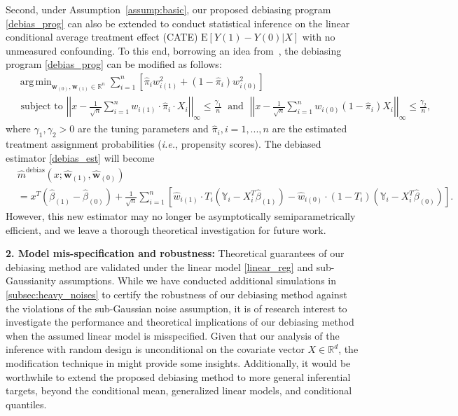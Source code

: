 \documentclass[ejsv2,noshowframe]{imsart}
\theoremstyle{plain}
\theoremstyle{definition}
\theoremstyle{remark}
\DeclareMathOperator*{\argmin}{arg\,min}
\newcommand{\norm}[1]{\left|\left| #1 \right|\right|}
\renewcommand{\hat}{\widehat}
\begin{document}
Second, under Assumption~\ref{assump:basic}, our proposed debiasing program \eqref{debias_prog} can also be extended to conduct statistical inference on the linear conditional average treatment effect (CATE) $\mathrm{E}[Y(1) - Y(0) | X]$ with no unmeasured confounding. To this end, borrowing an idea from~\cite{giessing2021inference}, the debiasing program \eqref{debias_prog} can be modified as follows:
\begin{align*}
	&\argmin_{\bm{w}_{(0)},\bm{w}_{(1)} \in \mathbb{R}^n}\sum_{i=1}^n \left[ \hat{\pi}_i w_{i(1)}^2 + (1-\hat{\pi}_i) w_{i(0)}^2\right]\\
	&\text{ subject to } \norm{x- \frac{1}{\sqrt{n}}\sum_{i=1}^n w_{i(1)}\cdot \hat{\pi}_i\cdot X_i }_{\infty} \leq \frac{\gamma_1}{n} \; \text{ and } \; \norm{x- \frac{1}{\sqrt{n}}\sum_{i=1}^n w_{i(0)}\left(1- \hat{\pi}_i\right) X_i }_{\infty} \leq \frac{\gamma_2}{n},
\end{align*}
where $\gamma_1,\gamma_2 >0$ are the tuning parameters and $\hat{\pi}_i,i=1,...,n$ are the estimated treatment assignment probabilities (\emph{i.e.}, propensity scores). The debiased estimator \eqref{debias_est} will become
\begin{align*}
	&\hat{m}^{\text{debias}}(x;\hat{\bm{w}}_{(1)},\hat{\bm{w}}_{(0)})\\ &= x^T \left(\hat{\beta}_{(1)} - \hat{\beta}_{(0)} \right) + \frac{1}{\sqrt{n}} \sum_{i=1}^n \left[\hat{w}_{i(1)} \cdot T_i \left(\mathbb{Y}_i-X_i^T \hat{\beta}_{(1)} \right) - \hat{w}_{i(0)} \cdot \left(1-T_i\right) \left(\mathbb{Y}_i-X_i^T \hat{\beta}_{(0)} \right) \right].
\end{align*}
However, this new estimator may no longer be asymptotically semiparametrically efficient, and we leave a thorough theoretical investigation for future work. 


{\bf 2. Model mis-specification and robustness:} Theoretical guarantees of our debiasing method are validated under the linear model \eqref{linear_reg} and sub-Gaussianity assumptions. While we have conducted additional simulations in \autoref{subsec:heavy_noises} to certify the robustness of our debiasing method against the violations of the sub-Gaussian noise assumption, it is of research interest to investigate the performance and theoretical implications of our debiasing method when the assumed linear model is misspecified. Given that our analysis of the inference with random design is unconditional on the covariate vector $X \in \mathbb{R}^d$, the modification technique in \cite{buhlmann2015high} might provide some insights. Additionally, it would be worthwhile to extend the proposed debiasing method to more general inferential targets, beyond the conditional mean, generalized linear models, and conditional quantiles.
\end{document}
